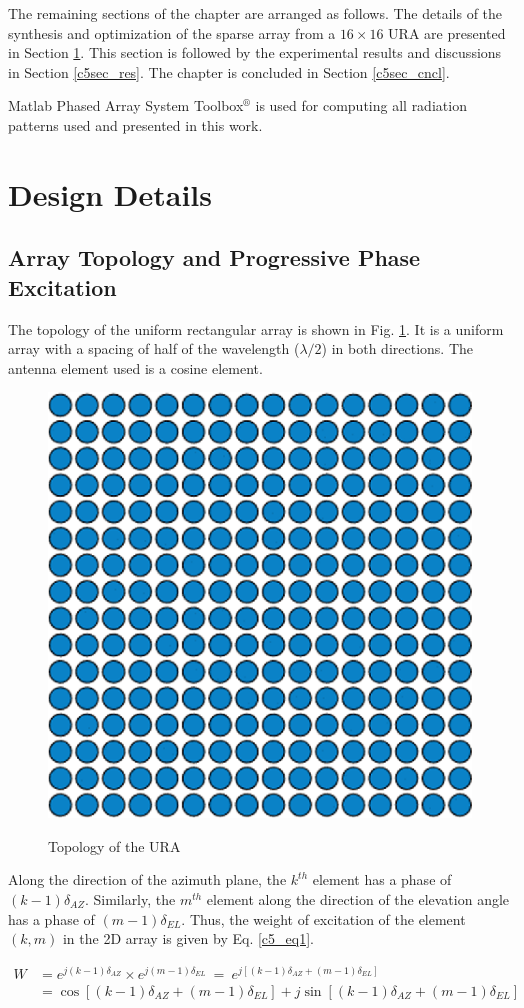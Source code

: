 The remaining sections of the chapter are arranged as follows. The details of the synthesis and optimization of the sparse array from a $16\times16$ URA are presented in Section \ref{c5sec_design}. This section is followed by the experimental results and discussions in Section \ref{c5sec_res}. The chapter is concluded in Section \ref{c5sec_cncl}.

Matlab Phased Array System Toolbox$^{\circledR}$ is used for computing all radiation patterns used and presented in this work.

\section{Design Details}\label{c5sec_design}
\subsection{Array Topology and Progressive Phase Excitation}
The topology of the uniform rectangular array is shown in Fig. \ref{fig_5_1}. It is a uniform array with a spacing of half of the wavelength ($\lambda/2$) in both directions. The antenna element used is a cosine element.

\begin{figure}
  \centering
  \includegraphics[width=0.4\linewidth]{Fig-naun_1.eps}\\
  \caption{Topology of the URA} \label{fig_5_1}
\end{figure}

Along the direction of the azimuth plane, the $k^{th}$ element has a phase of $(k-1)\delta_{AZ}$. Similarly, the $m^{th}$ element along the direction of the elevation angle has a phase of $(m-1)\delta_{EL}$. Thus, the weight of excitation of the element $(k, m)$ in the 2D array is given by Eq. \ref{c5_eq1}.

\begin{equation}\label{c5_eq1}
\begin{split}
W & = e^{j(k-1)\delta_{AZ}} \times e^{j(m-1)\delta_{EL}}~=~e^{j[(k-1)\delta_{AZ} + (m-1)\delta_{EL}]} \\
  & = \cos[(k-1)\delta_{AZ} + (m-1)\delta_{EL}] + j\sin[(k-1)\delta_{AZ} + (m-1)\delta_{EL}]
\end{split}
\end{equation}

